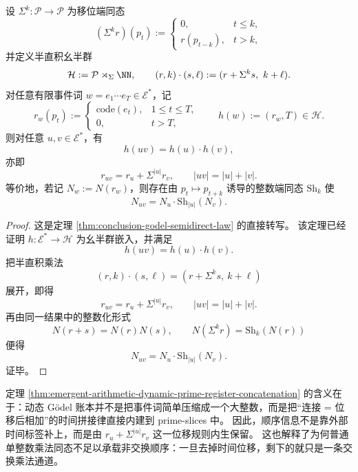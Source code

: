 \begin{theorem}[动态账本的拼接律与时间寻址]\label{thm:emergent-arithmetic-dynamic-prime-register-concatenation}
设 \(\Sigma^k:\mathcal P\to \mathcal P\) 为移位端同态
\[
(\Sigma^k r)(p_t):=
\begin{cases}
0,& t\le k,\\
r(p_{t-k}),& t>k,
\end{cases}
\]
并定义半直积幺半群
\[
\mathcal H:=\mathcal P\rtimes_{\Sigma}\NN,
\qquad
(r,k)\cdot(s,\ell):=(r+\Sigma^k s,\ k+\ell).
\]
对任意有限事件词 \(w=e_1\cdots e_T\in\mathcal E^\ast\)，记
\[
r_w(p_t):=
\begin{cases}
\mathrm{code}(e_t),& 1\le t\le T,\\
0,& t>T,
\end{cases}
\qquad
h(w):=(r_w,T)\in \mathcal H.
\]
则对任意 \(u,v\in\mathcal E^\ast\)，有
\[
h(uv)=h(u)\cdot h(v),
\]
亦即
\[
r_{uv}=r_u+\Sigma^{|u|}r_v,
\qquad
|uv|=|u|+|v|.
\]
等价地，若记 \(N_w:=N(r_w)\)，则存在由 \(p_t\mapsto p_{t+k}\) 诱导的整数端同态 \(\mathrm{Sh}_k\) 使
\[
N_{uv}=N_u\cdot \mathrm{Sh}_{|u|}(N_v).
\]
\end{theorem}

\begin{proof}
这是定理 \ref{thm:conclusion-godel-semidirect-law} 的直接转写。
该定理已经证明 \(h:\mathcal E^\ast\to \mathcal H\) 为幺半群嵌入，并满足
\[
h(uv)=h(u)\cdot h(v).
\]
把半直积乘法
\[
(r,k)\cdot(s,\ell)=(r+\Sigma^k s,\ k+\ell)
\]
展开，即得
\[
r_{uv}=r_u+\Sigma^{|u|}r_v,
\qquad
|uv|=|u|+|v|.
\]
再由同一结果中的整数化形式
\[
N( r+s)=N(r)N(s),
\qquad
N(\Sigma^k r)=\mathrm{Sh}_k(N(r))
\]
便得
\[
N_{uv}=N_u\cdot \mathrm{Sh}_{|u|}(N_v).
\]
证毕。
\end{proof}

\begin{remark}\label{rem:emergent-arithmetic-dynamic-prime-register-time-addressing}
定理 \ref{thm:emergent-arithmetic-dynamic-prime-register-concatenation} 的含义在于：动态 Gödel 账本并不是把事件词简单压缩成一个大整数，而是把“连接 = 位移后相加”的时间拼接律直接内建到 prime-slices 中。
因此，顺序信息不是靠外部时间标签补上，而是由 \(r_u+\Sigma^{|u|}r_v\) 这一位移规则内生保留。
这也解释了为何普通单整数乘法同态不足以承载非交换顺序：一旦去掉时间位移，剩下的就只是一条交换乘法通道。
\end{remark}

